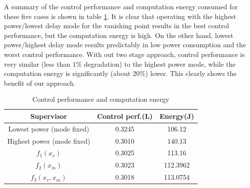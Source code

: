 A summary of the control performance and computation energy consumed for these five cases is shown in table \ref{tbl:performance}. It is clear that operating with the highest power/lowest delay mode for the vanishing point results in the best control performance, but the computation energy is high. On the other hand, lowest power/highest delay mode results predictably in low power consumption and the worst control performance. With out two stage approach, control performance is very similar (less than $1\%$ degradation) to the highest power mode, while the computation energy is significantly (about $20\%$) lower. This clearly shows the benefit of our approach.

\begin{table}[htb]
\begin{center}
\caption{Control performance and computation energy}
\label{tbl:performance}
\begin{tabular} {|c|c|c|}
	\hline
	\textbf{Supervisor} & \textbf{Control perf.}(L) & \textbf{Energy}(J) \\ \hline
	Lowest power (mode fixed) & 0.3245 & 106.12  \\ \hline
	Highest power (mode fixed) & 0.3010 & 140.13  \\ \hline
	 $f_1(x_v)$ & 0.3025 & 113.16  \\ \hline
	 $f_2(x_m)$ & 0.3023 & 112.3962 \\ \hline
	 $f_3(x_v,x_m)$ & 0.3018 & 113.0754 \\ \hline
	 
\end{tabular}
	\vspace{-10pt}	
	\end{center}
\end{table}


